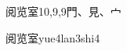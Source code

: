 \begin{entry}{阅览室}{10,9,9}{⾨、⾒、⼧}
  \begin{phonetics}{阅览室}{yue4lan3shi4}
  \end{phonetics}
\end{entry}
